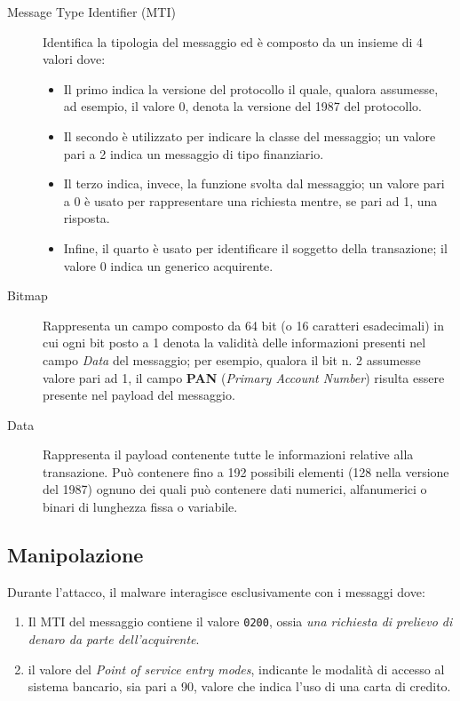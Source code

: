 \documentclass[10pt,a4paper, titlepage]{report}
\begin{document}
\begin{description}
\item[Message Type Identifier (MTI)] Identifica la tipologia del messaggio ed è composto da un insieme di 4 valori dove:

\begin{itemize}
\item Il primo indica la versione del protocollo il quale, qualora assumesse, ad esempio, il valore 0, denota la versione del 1987 del protocollo.
\item Il secondo è utilizzato per indicare la classe del messaggio; un valore pari a 2 indica un messaggio di tipo finanziario.
\item Il terzo indica, invece, la funzione svolta dal messaggio; un valore pari a 0 è usato per rappresentare una richiesta mentre, se pari ad 1, una risposta.
\item Infine, il quarto è usato per identificare il soggetto della transazione; il valore 0 indica un generico acquirente.
\end{itemize}

\item[Bitmap] Rappresenta un campo composto da 64 bit (o 16 caratteri esadecimali) in cui ogni bit posto a 1 denota la validità delle informazioni presenti nel campo \textit{Data} del messaggio; per esempio, qualora il bit n. 2 assumesse valore pari ad 1, il campo \textbf{PAN} (\textit{Primary Account Number}) risulta essere presente nel payload del messaggio.

\item[Data] Rappresenta il payload contenente tutte le informazioni relative alla transazione. Può contenere fino a 192 possibili elementi (128 nella versione del 1987) ognuno dei quali può contenere dati numerici, alfanumerici o binari di lunghezza fissa o variabile.
\end{description}

\subsection{Manipolazione}

Durante l'attacco, il malware interagisce esclusivamente con i messaggi dove:
\begin{enumerate}
\item Il MTI del messaggio contiene il valore \texttt{0200}, ossia \textit{una richiesta di prelievo di denaro da parte dell'acquirente}.
\item il valore del \textit{Point of service entry modes}, indicante le modalità di accesso al sistema bancario, sia pari a 90, valore che indica l'uso di una carta di credito.
\end{enumerate}
\end{document}
